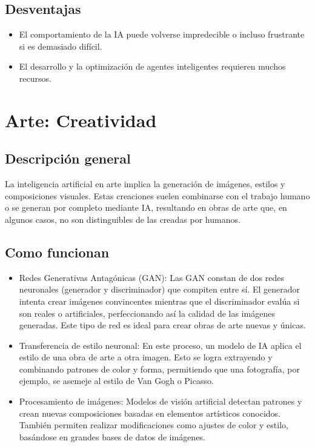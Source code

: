 \documentclass[12pt]{article}
\begin{document}
\subsection{Desventajas}
\begin{itemize}
    \item El comportamiento de la IA puede volverse impredecible o incluso frustrante si es demasiado difícil.
    \item El desarrollo y la optimización de agentes inteligentes requieren muchos recursos.
\end{itemize}

\section{Arte: Creatividad}
\subsection{Descripción general}

La inteligencia artificial en arte implica la generación de imágenes, estilos y composiciones visuales. Estas creaciones suelen 
combinarse con el trabajo humano o se generan por completo mediante IA, resultando en obras de arte que, en algunos casos, no son 
distinguibles de las creadas por humanos.

\subsection{Como funcionan}
\begin{itemize}
    \item Redes Generativas Antagónicas (GAN): 
    Las GAN constan de dos redes neuronales (generador y discriminador) que compiten entre sí. El generador intenta crear imágenes 
    convincentes mientras que el discriminador evalúa si son reales o artificiales, perfeccionando así la calidad de las imágenes generadas. 
    Este tipo de red es ideal para crear obras de arte nuevas y únicas.
    \item Transferencia de estilo neuronal: 
    En este proceso, un modelo de IA aplica el estilo de una obra de arte a otra imagen. 
    Esto se logra extrayendo y combinando patrones de color y forma, permitiendo que una fotografía, 
    por ejemplo, se asemeje al estilo de Van Gogh o Picasso.
    \item Procesamiento de imágenes:
    Modelos de visión artificial detectan patrones y crean nuevas composiciones basadas en elementos artísticos conocidos. 
    También permiten realizar modificaciones como ajustes de color y estilo, basándose en grandes bases de datos de imágenes.
\end{itemize}
\end{document}
